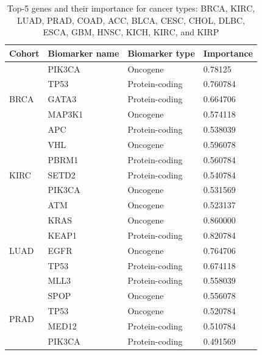 \begin{table}
    \caption{Top-5 genes and their importance for cancer types: BRCA, KIRC, LUAD, PRAD, COAD, ACC, BLCA, CESC, CHOL, DLBC, ESCA, GBM, HNSC, KICH, KIRC, and KIRP }
    \label{table:proteinimportance_1} %
    \begin{center}
    \scriptsize{
    \vspace{-6mm}
    \begin{tabular}{l|l|l|l}
        \toprule
        \textbf{Cohort} & \textbf{Biomarker name} & \textbf{Biomarker type} & \textbf{Importance} \\ 
        \midrule
        \multirow{5}{*}{BRCA} & PIK3CA & Oncogene & 0.78125 \\ %
        & TP53 & Protein-coding & 0.760784 \\ %
        & GATA3  & Protein-coding & 0.664706 \\ %
        & MAP3K1  & Oncogene & 0.574118 \\ %
        & APC   & Protein-coding & 0.538039 \\ 
        \midrule
        \multirow{5}{*}{KIRC} & VHL & Oncogene & 0.596078 \\ %
        & PBRM1 & Protein-coding  & 0.560784 \\ %
        & SETD2 & Protein-coding & 0.540784 \\ %
        & PIK3CA & Oncogene & 0.531569 \\ %
        & ATM & Oncogene & 0.523137 \\ %
        \midrule
        \multirow{5}{*}{LUAD} & KRAS & Oncogene & 0.860000 \\ %
        & KEAP1 & Protein-coding & 0.820784 \\ %
        & EGFR & Oncogene & 0.764706 \\ %
        & TP53 & Protein-coding & 0.674118 \\ %
        & MLL3 & Protein-coding & 0.558039 \\ %
        \midrule
        \multirow{5}{*}{PRAD}& SPOP & Oncogene & 0.556078 \\ %
        & TP53 & Oncogene & 0.520784 \\ %
        & MED12 & Protein-coding & 0.510784 \\ %
        & PIK3CA & Protein-coding & 0.491569 \\ %

\end{tabular}}
\end{center}
\end{table}
